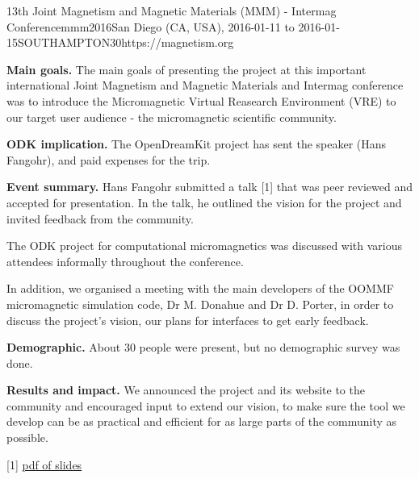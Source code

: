 \begin{event}{13th Joint Magnetism and Magnetic Materials (MMM) -
    Intermag Conference}{mmm2016}{San Diego (CA, USA), 2016-01-11 to
    2016-01-15}{SOUTHAMPTON}{30}{https://magnetism.org}

  \textbf{Main goals.} The main goals of presenting the project at
  this important international Joint Magnetism and Magnetic Materials
  and Intermag conference was to introduce the Micromagnetic Virtual
  Reasearch Environment (VRE) to our target user audience - the
  micromagnetic scientific community.


\textbf{ODK implication.} The OpenDreamKit project has sent the
speaker (Hans Fangohr), and paid expenses for the trip.

\textbf{Event summary.} Hans Fangohr submitted a talk [1] that was peer
reviewed and accepted for presentation. In the talk, he outlined the
vision for the project and invited feedback from the community.

The ODK project for computational micromagnetics was discussed with
various attendees informally throughout the conference.

In addition, we organised a meeting with the main developers of the
OOMMF micromagnetic simulation code, Dr M. Donahue and
Dr D. Porter, in order to discuss the project's vision, our plans for
interfaces to get early feedback.

\textbf{Demographic.} About 30 people were present, but no demographic survey was done.

\textbf{Results and impact.} We announced the project and its website
to the community and encouraged input to extend our vision, to make
sure the tool we develop can be as practical and efficient for as
large parts of the community as possible.

[1]
\href{http://joommf.github.io/assets/2016-01-12-MMM2016-AD02-Jupyter-OOMMF.pdf}{pdf
of slides}
\end{event}
